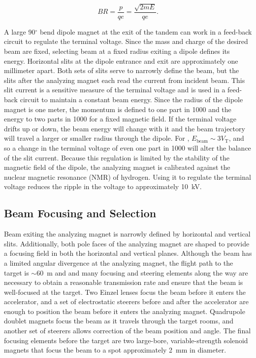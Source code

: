 \begin{equation}
BR = \frac{p}{qe} = \frac{\sqrt{2mE}}{qe}.
\label{eqn:rigidity}
\end{equation}

A large 90$^{\circ}$ bend dipole magnet at the exit of the tandem can work in a feed-back circuit to regulate the terminal voltage.  Since the mass and charge of the desired beam are fixed, selecting beam at a fixed radius exiting a dipole defines its energy.  Horizontal slits at the dipole entrance and exit are approximately one millimeter apart.  Both sets of slits serve to narrowly define the beam, but the slits after the analyzing magnet each read the current from incident beam.  This slit current is a sensitive measure of the terminal voltage and is used in a feed-back circuit to maintain a constant beam energy.  Since the radius of the dipole magnet is one meter, the momentum is defined to one part in 1000 and the energy to two parts in 1000 for a fixed magnetic field.  If the terminal voltage drifts up or down, the beam energy will change with it and the beam trajectory will travel a larger or smaller radius through the dipole.  For , $E_{\text{beam}}\sim3V_{\text{T}}$, and so a change in the terminal voltage of even one part in 1000 will alter the balance of the slit current.  Because this regulation is limited by the stability of the magnetic field of the dipole, the analyzing magnet is calibrated against the nuclear magnetic resonance (NMR) of hydrogen.  Using it to regulate the terminal voltage reduces the ripple in the voltage to approximately 10~kV.


\subsection{Beam Focusing and Selection}

Beam exiting the analyzing magnet is narrowly defined by horizontal and vertical slits.  Additionally, both pole faces of the analyzing magnet are shaped to provide a focusing field in both the horizontal and vertical planes.  Although the beam has a limited angular divergence at the analyzing magnet, the flight path to the target is $\sim60$~m and and many focusing and steering elements along the way are necessary to obtain a reasonable transmission rate and ensure that the beam is well-focused at the target.  Two Einzel lenses \citep{BeamOptics} focus the beam before it enters the accelerator, and a set of electrostatic steerers before and after the accelerator are enough to position the beam before it enters the analyzing magnet.  Quadrupole doublet magnets focus the beam as it travels through the target rooms, and another set of steerers allows correction of the beam position and angle.  The final focusing elements before the target are two large-bore, variable-strength solenoid magnets \citep{TwinSol} that focus the beam to a spot approximately 2~mm in diameter.

